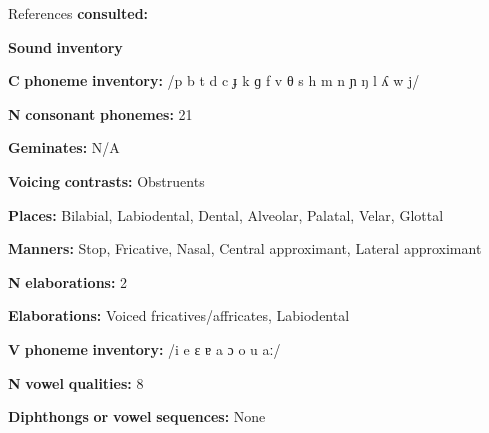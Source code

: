 \documentclass[output=paper]{langsci/langscibook}
\begin{document}
\begin{styleBody}
References \textbf{consulted:} \citet{Clark2008}
\end{styleBody}

\begin{styleBody}
\textbf{Sound} \textbf{inventory}
\end{styleBody}

\begin{styleBody}
\textbf{C} \textbf{phoneme} \textbf{inventory:} /p b t d c ɟ k ɡ f v θ s h m n ɲ ŋ l ʎ w j/
\end{styleBody}

\begin{styleBody}
\textbf{N} \textbf{consonant} \textbf{phonemes:} 21
\end{styleBody}

\begin{styleBody}
\textbf{Geminates:} N/A
\end{styleBody}

\begin{styleBody}
\textbf{Voicing} \textbf{contrasts:} Obstruents
\end{styleBody}

\begin{styleBody}
\textbf{Places:} Bilabial, Labiodental, Dental, Alveolar, Palatal, Velar, Glottal
\end{styleBody}

\begin{styleBody}
\textbf{Manners:} Stop, Fricative, Nasal, Central approximant, Lateral approximant
\end{styleBody}

\begin{styleBody}
\textbf{N} \textbf{elaborations:} 2
\end{styleBody}

\begin{styleBody}
\textbf{Elaborations:} Voiced fricatives/affricates, Labiodental
\end{styleBody}

\begin{styleBody}
\textbf{V} \textbf{phoneme} \textbf{inventory:} /i e ɛ ɐ a ɔ o u aː/
\end{styleBody}

\begin{styleBody}
\textbf{N} \textbf{vowel} \textbf{qualities:} 8
\end{styleBody}

\begin{styleBody}
\textbf{Diphthongs} \textbf{or} \textbf{vowel} \textbf{sequences:} None
\end{styleBody}
\end{document}
